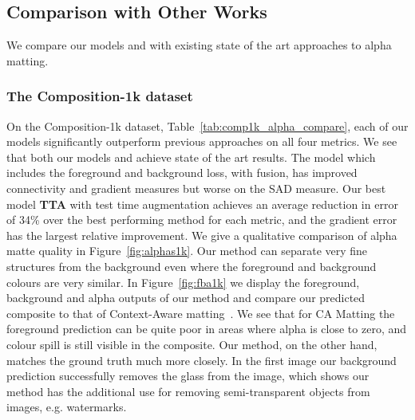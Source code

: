 \documentclass[runningheads]{llncs}
\begin{document}
\subsection{Comparison with Other Works}

We compare our models \textbf{} and  with existing state of the art approaches to alpha matting. 


\subsubsection{The Composition-1k dataset}

On the Composition-1k dataset, Table~\ref{tab:comp1k_alpha_compare}, each of our models significantly outperform previous approaches on all four metrics. We see that both our models \textbf{} and \textbf{} achieve state of the art results. The model \textbf{} which includes the foreground and background loss, with fusion, has improved connectivity and gradient measures but worse on the SAD measure.
Our best model \textbf{ TTA} with test time augmentation achieves an average reduction in error of 34\% over the best performing method for each metric, and the gradient error has the largest relative improvement. 
We give a qualitative comparison of alpha matte quality in Figure~\ref{fig:alphas1k}. Our method can separate very fine structures from the background even where the foreground and background colours are very similar.  In Figure~\ref{fig:fba1k} we display the foreground, background and alpha outputs of our method and compare our predicted composite to that of Context-Aware matting~\cite{ContextMatting}. We see that for CA Matting the foreground prediction can be quite poor in areas where alpha is close to zero, and colour spill is still visible in the  composite. Our method, on the other hand, matches the ground truth much more closely. In the first image our background prediction successfully removes the glass from the image, which shows our method has the additional use for removing semi-transparent objects from images, e.g. watermarks.
\end{document}
